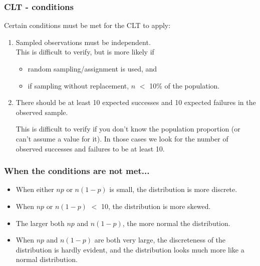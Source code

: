 \documentclass[t,compress,mathserif]{beamer}
\begin{document}

\begin{frame}
\frametitle{CLT - conditions}

Certain conditions must be met for the CLT to apply:

\begin{enumerate}

\item {} Sampled observations must be independent. \\

This is difficult to verify, but is more likely if
\begin{itemize}
\item random sampling/assignment is used, and
\item if sampling without replacement, $n$ $<$ 10\% of the population.
\end{itemize}

\pause

\item {} There should be at least 10 expected successes and 10 expected failures in the observed sample.

This is difficult to verify if you don't know the population proportion (or can't assume a value for it). In those cases we look for the number of observed successes and failures to be at least 10.

\end{enumerate}

\end{frame}


\begin{frame}
\frametitle{When the conditions are not met...}

\begin{itemize}

\item When either $np$ or $n(1-p)$ is small, the distribution is more discrete.
\item When $np$ or $n(1-p)$ $<$ 10, the distribution is more skewed.
\item The larger both $np$ and $n(1-p)$, the more normal the distribution.
\item When $np$ and $n(1-p)$ are both very large, the discreteness of the distribution is hardly evident, and the distribution looks much more like a normal distribution.

\end{itemize}

\end{frame}
\end{document}
